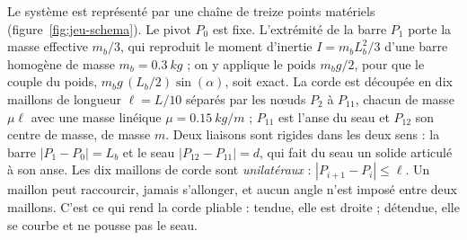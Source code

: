 Le système est représenté par une chaîne de treize points matériels
(figure~\ref{fig:jeu-schema}). Le pivot \(P_0\) est fixe. L'extrémité de la barre
\(P_1\) porte la masse effective \(m_b/3\), qui reproduit le moment d'inertie
\(I = m_b L_b^2/3\) d'une barre homogène de masse \(m_b = \SI{0,3}{kg}\) ; on y applique
le poids \(m_b g/2\), pour que le couple du poids, \(m_b g \, (L_b/2) \sin(\alpha)\), soit
exact. La corde
est découpée en dix maillons de longueur \(\ell = L/10\) séparés par les nœuds
\(P_2\) à \(P_{11}\), chacun de masse \(\mu \ell\) avec une masse linéique
\(\mu = \SI{0,15}{kg/m}\) ; \(P_{11}\) est l'anse du seau et \(P_{12}\) son centre
de masse, de masse \(m\). Deux liaisons sont rigides dans les deux sens : la barre
\(|P_1 - P_0| = L_b\) et le seau \(|P_{12} - P_{11}| = d\), qui fait du seau un
solide articulé à son anse. Les dix maillons de corde sont \emph{unilatéraux} :
\(|P_{i+1} - P_i| \leq \ell\). Un maillon peut raccourcir, jamais s'allonger, et
aucun angle n'est imposé entre deux maillons. C'est ce qui rend la corde
pliable : tendue, elle est droite ; détendue, elle se courbe et ne pousse pas le
seau.

